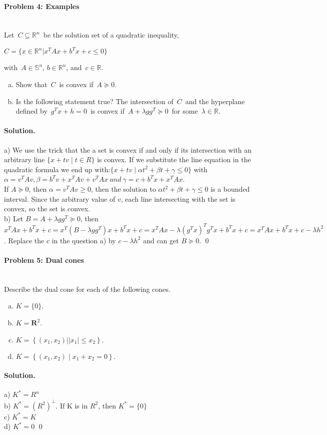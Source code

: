 \documentclass[a4paper]{article}
\newenvironment{solution}
{\color{blue} \paragraph{Solution.}}
{\newline \qed}
\begin{document}
\paragraph{Problem 4: Examples}
~\\

\noindent
Let~$C \subseteq \mathbb{R}^n$~be the solution set of a quadratic inequality,
\begin{center}
    $C = \{x \in \mathbb{R}^n|x^TAx + b^Tx + c \leqslant 0\}$
\end{center}
with~$A \in \mathbb{S}^n$, $b \in \mathbb{R}^n$, and~$c \in \mathbb{R}$.
\begin{enumerate}[a)]
    \item Show that~$C$~is convex if~$A \succeq 0$.

    \item Is the following statement true? The intersection of~$C$~and the hyperplane defined by~$g^Tx+h=0$~is convex if~$A+\lambda gg^T \succeq 0$~for some~$\lambda \in \mathbb{R}$.
\end{enumerate}
\begin{solution}
    a) We use the trick that the a set is convex if and only if its intersection with an arbitrary line $\{ x + tv \mid t\in R\}$ is convex. If we substitute the line equation in the quadratic formula we end up with:$\{x+tv \mid \alpha t^2+\beta t + \gamma \leq 0 \}$ with $\alpha = v^TAv , \beta = b^Tv + x^TAv + v^TAx\ and\ \gamma = c+b^Tx+x^TAx$. \\
    If $A \succeq 0$, then $\alpha = v^TAv \geq 0$, then the solution to $\alpha t^2+\beta t + \gamma \leq 0$ is a bounded interval. Since the arbitrary value of $v$, each line intersecting with the set is convex, so the set is convex.\\
    b) Let $B = A + \lambda g g^T \succeq 0$, then $x^TAx + b^Tx + c = x^T(B - \lambda gg^T)x + b^Tx + c = x^TAx - \lambda (g^Tx)^Tg^Tx + b^Tx + c = x^TAx + b^Tx + c - \lambda h^2$. Replace the $c$ in the question a) by $c - \lambda h^2$ and can get $B \succeq 0$.
\end{solution}
\paragraph{Problem 5: Dual cones}
~\\

\noindent
Describe the dual cone for each of the following cones.
\begin{enumerate}[a)]
    \item $K=\{0\}$.
    \item $K=\mathbf{R}^{2}$.
    \item $K=\left\{\left(x_{1}, x_{2}\right)|| x_{1} \mid \leq x_{2}\right\}.$
    \item $K=\left\{\left(x_{1}, x_{2}\right) \mid x_{1}+x_{2}=0\right\}.$
\end{enumerate}
\begin{solution}
    a) $K^* = R^n$\\
    b) $K^* = (R^2)^\perp$. If K is in $R^2$, then $K^* = \{0\}$\\
    c) $K^* = K$\\
    d) $K^* = 0$
\end{solution}
\end{document}
